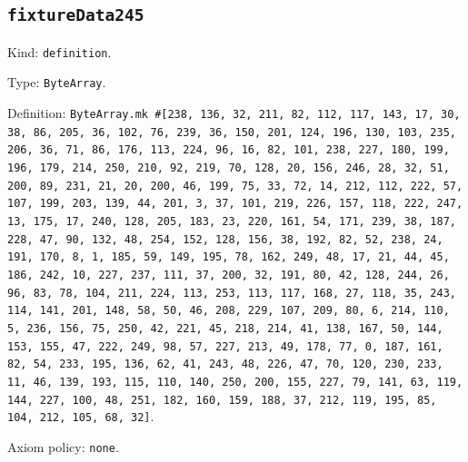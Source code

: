 \documentclass[11pt]{article}
\begin{document}
\subsection*{\texttt{fixtureData245}}
\noindent Kind: \texttt{definition}.\par
\noindent Type: \texttt{ByteArray}.\par
\noindent Definition: \texttt{ByteArray.mk \#[238, 136, 32, 211, 82, 112, 117, 143, 17, 30, 38, 86, 205, 36, 102, 76, 239, 36, 150, 201, 124, 196, 130, 103, 235, 206, 36, 71, 86, 176, 113, 224, 96, 16, 82, 101, 238, 227, 180, 199, 196, 179, 214, 250, 210, 92, 219, 70, 128, 20, 156, 246, 28, 32, 51, 200, 89, 231, 21, 20, 200, 46, 199, 75, 33, 72, 14, 212, 112, 222, 57, 107, 199, 203, 139, 44, 201, 3, 37, 101, 219, 226, 157, 118, 222, 247, 13, 175, 17, 240, 128, 205, 183, 23, 220, 161, 54, 171, 239, 38, 187, 228, 47, 90, 132, 48, 254, 152, 128, 156, 38, 192, 82, 52, 238, 24, 191, 170, 8, 1, 185, 59, 149, 195, 78, 162, 249, 48, 17, 21, 44, 45, 186, 242, 10, 227, 237, 111, 37, 200, 32, 191, 80, 42, 128, 244, 26, 96, 83, 78, 104, 211, 224, 113, 253, 113, 117, 168, 27, 118, 35, 243, 114, 141, 201, 148, 58, 50, 46, 208, 229, 107, 209, 80, 6, 214, 110, 5, 236, 156, 75, 250, 42, 221, 45, 218, 214, 41, 138, 167, 50, 144, 153, 155, 47, 222, 249, 98, 57, 227, 213, 49, 178, 77, 0, 187, 161, 82, 54, 233, 195, 136, 62, 41, 243, 48, 226, 47, 70, 120, 230, 233, 11, 46, 139, 193, 115, 110, 140, 250, 200, 155, 227, 79, 141, 63, 119, 144, 227, 100, 48, 251, 182, 160, 159, 188, 37, 212, 119, 195, 85, 104, 212, 105, 68, 32]}.\par
\noindent Axiom policy: \texttt{none}.\par
\end{document}
